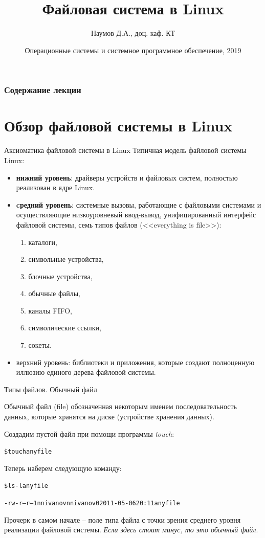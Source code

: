 \documentclass[xcolor=table]{beamer}
\title[Файловая система]{Файловая система в Linux}
\author{Наумов Д.А., доц. каф. КТ}
\date[29.10.2019] {Операционные системы и системное программное обеспечение, 2019}
\begin{document}
\begin{frame}
  \titlepage
\end{frame}
  
\begin{frame}
  \frametitle{Содержание лекции}
  \tableofcontents  
\end{frame}

\section{Обзор файловой системы в Linux}
	
\begin{frame}{Аксиоматика файловой системы в Linux}
	Типичная модель файловой системы Linux:
	\begin{itemize}
		\item \textbf{нижний уровень}: драйверы устройств и файловых систем, полностью реализован в ядре Linux.
		\item \textbf{cредний уровень}: системные вызовы, работающие с файловыми системами и осуществляющие низкоуровневый ввод-вывод, унифицированный интерфейс файловой системы, семь типов файлов (<<everything is file>>): 
		\begin{enumerate}
			\item каталоги, 
			\item символьные устройства, 
			\item блочные устройства,
			\item обычные файлы, 
			\item каналы FIFO, 
			\item символические ссылки,
			\item сокеты.
		\end{enumerate}
		\item верхний уровень: библиотеки и приложения, которые создают полноценную иллюзию единого дерева файловой системы.
	\end{itemize}
\end{frame}

\begin{frame}[fragile]{Типы файлов. Обычный файл}
	\begin{block}{Обычный файл (file)}
		обозначенная некоторым именем последовательность данных, которые хранятся на диске (устройстве хранения данных).
	\end{block}
	\begin{block}{Создадим пустой файл при помощи программы \textit{touch}:}
		\begin{alltt}
			\$ touch anyfile
		\end{alltt}
	\end{block}
	\begin{block}{Теперь наберем следующую команду:}
		\begin{alltt}
			\$ ls -l anyfile

			-rw-r--r-- 1 nnivanov nnivanov 0 2011-05-06 20:11 anyfile
		\end{alltt}
	\end{block}
	Прочерк в самом начале -- поле типа файла с точки зрения среднего уровня реализации файловой системы. \textit{Если здесь стоит минус, то это обычный файл}.
\end{frame}
\end{document}
